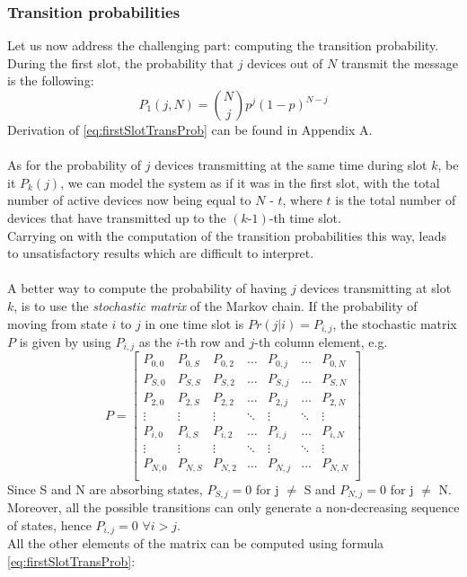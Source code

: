 \subsubsection{Transition probabilities}
Let us now address the challenging part: computing the transition probability.\\
During the first slot, the probability that $j$ devices out of $N$ transmit
the message is the following:
\begin{equation}
	P_{1}(j, N) = {N \choose j} p^{j} (1 - p)^{N - j}
	\label{eq:firstSlotTransProb}
\end{equation}
Derivation of \ref{eq:firstSlotTransProb} can be found in Appendix A.\\
\\
As for the probability of $j$ devices transmitting at the same time during slot
$k$, be it $P_{k}(j)$, we can model the system as if it was in the first slot,
with the total number of active devices now being equal to $N$ - $t$, where $t$
is the total number of devices that have transmitted up to the $(k\text{-}1)$-th
time slot.\\
Carrying on with the computation of the transition probabilities this way, leads
to unsatisfactory results which are difficult to interpret.\\
\\
A better way to compute the probability of having $j$ devices transmitting at
slot $k$, is to use the \textit{stochastic matrix} of the Markov chain. If the
probability of moving from state $i$ to $j$ in one time slot is
$Pr(j|i) = P_{i,j}$, the stochastic matrix $P$ is given by using
$P_{i,j}$ as the $i$-th row and $j$-th column element, e.g.
\begin{equation*}
P = 
\begin{bmatrix}
P_{0,0}	& P_{0,S}	& P_{0,2}	& \dots  	& P_{0,j}	& \dots		& P_{0,N} \\
P_{S,0}	& P_{S,S}	& P_{S,2}	& \dots  	& P_{S,j}	& \dots		& P_{S,N} \\
P_{2,0}	& P_{2,S}	& P_{2,2}	& \dots  	& P_{2,j}	& \dots		& P_{2,N} \\
\vdots	& \vdots	& \vdots	& \ddots 	& \vdots	& \ddots	& \vdots \\
P_{i,0}	& P_{i,S}	& P_{i,2}	& \dots		& P_{i,j}	& \dots		& P_{i,N} \\
\vdots	& \vdots	& \vdots	& \ddots	& \vdots	& \ddots	& \vdots \\
P_{N,0}	& P_{N,S}	& P_{N,2}	& \dots		& P_{N,j}	& \dots		& P_{N,N} \\
\end{bmatrix}
\label{stochasticMatrix1}
\end{equation*}
\hfill \break
Since S and N are absorbing states, $P_{S,j}=0$ for j $\neq$ S and $P_{N,j}=0$ for j $\neq$ N.\\
Moreover, all the possible transitions can only generate a non-decreasing sequence of states, hence $P_{i, j} = 0 $ $ \forall i > j $.\\
All the other elements of the matrix can be computed using formula \ref{eq:firstSlotTransProb}:

